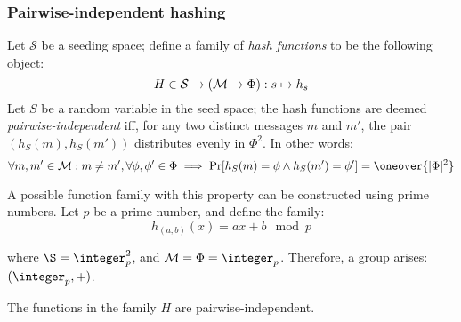 \subsubsection{Pairwise-independent hashing}

\begin{definition}
    Let $\mathcal{S}$ be a seeding space; define a family of \emph{hash functions} to be the following object:
    \[
        H \in \mathcal{S} \to (\mathcal{M} \to \Phi) : s \mapsto h_s
    \]
    Let $S$ be a random variable in the seed space; the hash functions are deemed \emph{pairwise-independent} iff, for any two distinct messages $m$ and $m'$, the pair $(h_S(m), h_S(m'))$ distributes evenly in $\Phi^2$. In other words:
    \[
        \forall m, m' \in \M : m \neq m', \forall \phi, \phi' \in \Phi \implies \Pr[h_S(m) = \phi \wedge h_S(m') = \phi'] = \oneover{|\Phi|^2}
    \]
\end{definition}

A possible function family with this property can be constructed using prime numbers. Let $p$ be a prime number, and define the family:
\[
    h_{(a, b)}(x) = ax + b \mod p
\]

where $\S = \integer_p^2$, and $\M = \Phi = \integer_p$. Therefore, a group arises: $(\integer_p, +)$.

\begin{theorem}
    The functions in the family $H$ are pairwise-independent.
\end{theorem}

